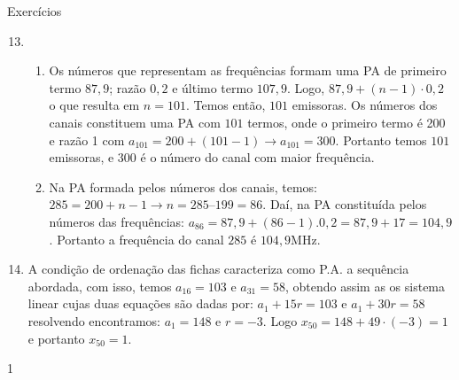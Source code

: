 \begin{answer}{Exercícios}
{\exerciselist
\begin{enumerate}\setcounter{enumi}{12}
\item
\begin{enumerate}
\item Os números que representam as frequências formam uma PA de primeiro termo $87{,}9$; razão $0{,}2$ e último termo $107{,}9$. Logo, $87{,}9+(n-1)\cdot0{,}2$ o que resulta em $n=101$. Temos então, $101$ emissoras. Os números dos canais constituem uma PA com $101$ termos, onde o primeiro termo é 200 e razão 1 com $a_{101}=200+(101-1)\to a_{101}=300$. Portanto temos $101$ emissoras, e $300$ é o número do canal com maior frequência.

\item Na PA formada pelos números dos canais, temos: $285=200+n-1\to n=285–199=86$. Daí, na PA constituída pelos números das frequências: $a_86=87{,}9+(86-1).0{,}2=87{,}9+17=104{,}9$. Portanto a frequência do canal $285$ é $104{,}9$MHz.
\end{enumerate}
\item A condição de ordenação das fichas caracteriza como P.A. a sequência abordada, com isso, temos $a_16=103$ e $a_31=58$, obtendo assim as os sistema linear cujas duas equações são dadas por: $a_1+15r=103$ e $a_1+30r=58$ resolvendo encontramos: $a_1=148$ e $r=-3$. Logo $x_50=148+49\cdot(-3)=1$ e portanto $x_50=1$.
\end{enumerate}
}{1}
\end{answer}


